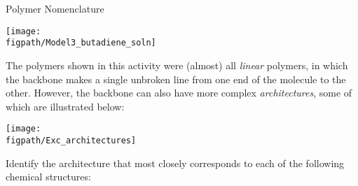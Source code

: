 \begin{activity}{Polymer Nomenclature}
\begin{ctqs}
\begin{enumerate}
				\begin{solution}[1in]{}
			\centerline{\texttt{[image: \\figpath/Model3\_butadiene\_soln]}}
		\end{solution}
				
		\end{enumerate}
	
\end{ctqs}


\clearpage
\begin{exercises}

	
		
		
			
			
			
		
		
	
		
	\exercise The polymers shown in this activity were (almost) all \emph{linear} polymers, in which the backbone makes a single unbroken line from one end of the molecule to the other.  However, the backbone can also have more complex \emph{architectures}, some of which are illustrated below:
	
	\vspace{6pt}	\centerline{\texttt{[image: \\figpath/Exc\_architectures]}}
	
		Identify the architecture that most closely corresponds to each of the following chemical structures:
		

\end{exercises}
\end{activity}
